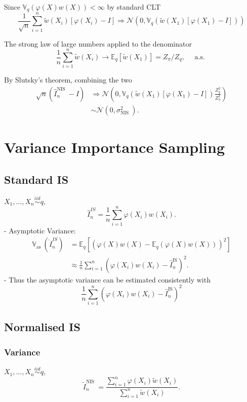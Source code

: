 \documentclass{article}
\begin{document}
Since $\mathbb{V}_q(\varphi(X) w(X))<\infty$ by standard CLT
$$
\frac{1}{\sqrt{n}} \sum_{i=1}^n \widetilde{w}\left(X_i\right)\left[\varphi\left(X_i\right)-I\right] \Rightarrow \mathcal{N}\left(0, \mathbb{V}_q\left(\widetilde{w}\left(X_1\right)\left[\varphi\left(X_1\right)-I\right]\right)\right)
$$

The strong law of large numbers applied to the denominator
$$
\frac{1}{n} \sum_{i=1}^n \widetilde{w}\left(X_i\right) \rightarrow \mathbb{E}_q\left[\widetilde{w}\left(X_1\right)\right]=Z_\pi / Z_q, \quad \text { a.s. }
$$

By Slutsky's theorem, combining the two
$$
\begin{aligned}
\sqrt{n}\left(\widehat{I}_n^{\text {NIS }}-I\right) & \Rightarrow \mathcal{N}\left(0, \mathbb{V}_q\left(\widetilde{w}\left(X_1\right)\left[\varphi\left(X_1\right)-I\right]\right) \frac{Z_q^2}{Z_\pi^2}\right) \\
& \sim \mathcal{N}\left(0, \sigma_{\text {NIS }}^2\right) .
\end{aligned}
$$
\section{Variance Importance Sampling}
\subsection{Standard IS}
$X_1, \ldots, X_n \stackrel{i i d}{\sim} q$,
$$
\widehat{I}_n^{IS}=\frac{1}{n} \sum_{i=1}^n \varphi\left(X_i\right) w\left(X_i\right) .
$$
- Asymptotic Variance:
$$
\begin{aligned}
\mathbb{V}_{\text {as }}\left(\grave{I}_n^{IS}\right) & =\mathbb{E}_q\left[\left(\varphi(X) w(X)-\mathbb{E}_q(\varphi(X) w(X))\right)^2\right] \\
& \approx \frac{1}{n} \sum_{i=1}^n\left(\varphi\left(X_i\right) w\left(X_i\right)-\hat{I}_n^{\mathrm{IS}}\right)^2 .
\end{aligned}
$$
- Thus the asymptotic variance can be estimated consistently with
$$
\frac{1}{n} \sum_{i=1}^n\left(\varphi\left(X_i\right) w\left(X_i\right)-\widehat{I}_n^{\mathrm{IS}}\right)^2
$$
\subsection{Normalised IS}
\subsubsection{Variance}
$X_1, \ldots, X_n \stackrel{i i d}{\sim} q$,
$$
\widetilde{I}_n^{\text {NIS }}=\frac{\sum_{i=1}^n \varphi\left(X_i\right) \widetilde{w}\left(X_i\right)}{\sum_{i=1}^n \widetilde{w}\left(X_i\right)} .
$$
\end{document}

